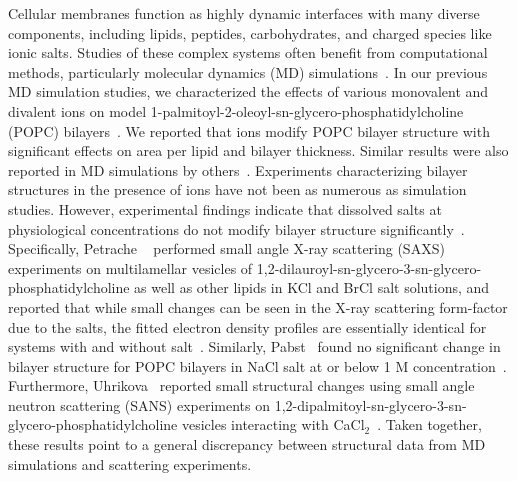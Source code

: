Cellular membranes function as highly dynamic interfaces with many diverse components, 
including lipids, peptides, carbohydrates, and charged species like ionic salts.
Studies of these complex systems often benefit from computational methods, 
particularly molecular dynamics (MD) simulations~\cite{berkowitz:2019}. 
In our previous MD simulation studies, we characterized the effects of various 
monovalent and divalent ions on model 1-palmitoyl-2-oleoyl-sn-glycero-phosphatidylcholine (POPC) 
bilayers~\cite{pandit:2008:simulationtextbook,kruczek:2017,kruczek:2019,saunders:2019}. 
We reported that ions modify POPC bilayer structure with significant
effects on area per lipid and bilayer thickness. Similar results were also reported in MD simulations by
others~\cite{Bockmann:2003,cordomi:2008,gurtovenko:2008,Cordomi:2009,jurkiewicz:2012}.
Experiments characterizing bilayer structures in the presence of ions
have not been as numerous as simulation studies. However, experimental findings indicate that 
dissolved salts at physiological concentrations do not modify bilayer structure
significantly~\cite{pabst:2007,petrache:2006:swelling,uhrikova:2008}.
Specifically, Petrache \etal~ performed small angle X-ray scattering (SAXS) experiments on
multilamellar vesicles of 1,2-dilauroyl-sn-glycero-3-sn-glycero-phosphatidylcholine 
as well as other lipids in KCl and BrCl salt solutions, 
and reported that while small changes can be seen in the
X-ray scattering form-factor due to the 
salts, 
the fitted electron density profiles are essentially identical for
systems with and without 
salt~\cite{petrache:2006:swelling}. 
Similarly, Pabst \etal~found no significant change in bilayer structure 
for POPC bilayers in NaCl salt at or below 1 M concentration~\cite{pabst:2007}.
Furthermore, Uhrikova \etal~reported small structural changes using small angle neutron scattering
(SANS) experiments on 1,2-dipalmitoyl-sn-glycero-3-sn-glycero-phosphatidylcholine 
vesicles interacting with CaCl$_{2}$~\cite{uhrikova:2008}. 
Taken together, these results point to a general discrepancy between structural data 
from MD simulations and scattering experiments.

